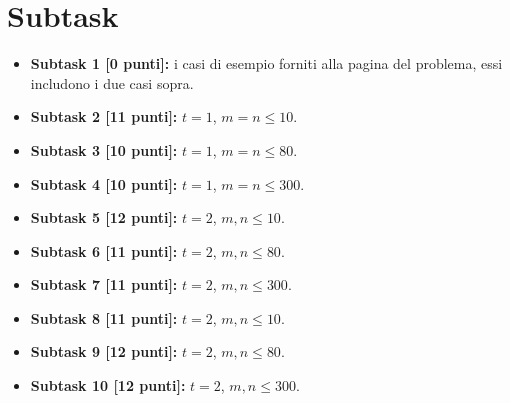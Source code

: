\vspace{0.5cm}


\vspace{0.5cm}


\vspace{0.5cm}


\vspace{0.5cm}


\section*{Subtask}

  \begin{itemize}
    \item \textbf{Subtask 1 [0 punti]:} i casi di esempio forniti alla pagina del problema, essi includono i due casi sopra.
    
    \item \textbf{Subtask 2 [11 punti]:} $t=1$, $m=n \le 10$.
    \item \textbf{Subtask 3 [10 punti]:} $t=1$, $m=n \le 80$.
    \item \textbf{Subtask 4 [10 punti]:} $t=1$, $m=n \le 300$.
      
    \item \textbf{Subtask 5 [12 punti]:} $t=2$, $m,n \le 10$.
    \item \textbf{Subtask 6 [11 punti]:} $t=2$, $m,n \le 80$.
    \item \textbf{Subtask 7 [11 punti]:} $t=2$, $m,n \le 300$.
      
    \item \textbf{Subtask 8 [11 punti]:} $t=2$, $m,n \le 10$.
    \item \textbf{Subtask 9 [12 punti]:} $t=2$, $m,n \le 80$.
    \item \textbf{Subtask 10 [12 punti]:} $t=2$, $m,n \le 300$.
      
  \end{itemize}
  
